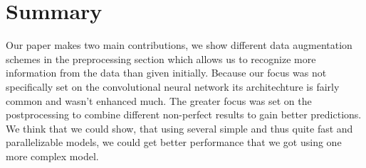 \documentclass[10pt,conference,compsocconf]{IEEEtran}
\begin{document}
\section{Summary}
Our paper makes two main contributions, we show different data augmentation schemes in the preprocessing section which allows us to recognize more information from the data than given initially. Because our focus was not specifically set on the convolutional neural network its architechture is fairly common and wasn't enhanced much. The greater focus was set on the postprocessing to combine different non-perfect results to gain better predictions. We think that we could show, that using several simple and thus quite fast and parallelizable models, we could get better performance that we got using one more complex model.



\end{document}
